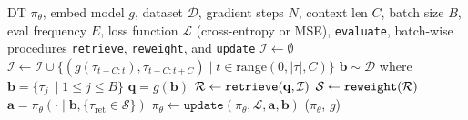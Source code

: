 \renewcommand{\algorithmicensure}{\textbf{Output:}}
\renewcommand{\algorithmicrequire}{\textbf{Input:}}
\renewcommand{\algorithmiccomment}[1]{$\triangleright$ #1}
\begin{algorithm}[H]
\caption{RA-DT at training time}
\label{alg:radt-train}
  \begin{algorithmic}[1]
    \REQUIRE DT $\pi_{\theta}$, embed model $g$, dataset $\mathcal{D}$, gradient steps $N$, context len $C$, batch size $B$, eval frequency $E$, loss function $\mathcal{L}$ (cross-entropy or MSE), \texttt{evaluate}, batch-wise procedures \texttt{retrieve}, \texttt{reweight}, and \texttt{update}
    \STATE $\mathcal{I} \gets \emptyset$ \hfill{}
        \STATE $\mathcal{I} \gets \mathcal{I} \cup \{(g(\tau_{t-C:t}), \tau_{t-C:t+C}) \mid t \in \text{range}(0, |\tau|, C)\}$ \hfill{}
    \ENDFOR
        \STATE $\mathbf{b} \sim \mathcal{D}$ where $\mathbf{b}=\{\tau_j\ \mid 1 \leq j \leq B\} $ \hfill{}
        \STATE $\mathbf{q} = g(\mathbf{b})$ \hfill{}
        \STATE $\mathcal{R} \gets \text{\texttt{retrieve}}(\mathbf{q}, \mathcal{I})$ \hfill{}
        \STATE $\mathcal{S} \gets \text{\texttt{reweight}}(\mathcal{R})$ \hfill{}
        \STATE $\mathbf{a} = \pi_{\theta} (\cdot \mid \mathbf{b}, \{\tau_{\text{ret}} \in \mathcal{S}\} )$ \hfill{}
        \STATE $\pi_{\theta} \gets \texttt{update}(\pi_{\theta}, \mathcal{L}, \mathbf{a}, \mathbf{b})$ \hfill{}
            \STATE {}($\pi_{\theta}$, $g$) \hfill{}
        \ENDIF
    \ENDFOR
  \end{algorithmic}
\end{algorithm}

